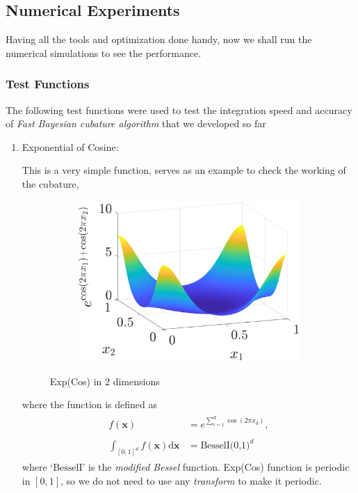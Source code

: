 \documentclass[smallextended]{svjour3}       %
\newcommand{\bm}[1]{\boldsymbol{#1}}
\newcommand{\dif}[1]{\text{d}{#1}}
\newcommand{\vx}{\bm{x}}
\newcommand{\dvx}{\dif{\bm{x}}}
\begin{document}
\subsection{Numerical Experiments}
\label{sec:numerical_experiments}

Having all the tools and optimization done handy, now we shall run the numerical simulations to see the performance.

\subsubsection{Test Functions}

The following test functions were used to test the integration speed and accuracy of \textit{Fast Bayesian cubature algorithm} that we developed so far

\begin{enumerate}
\item Exponential of Cosine: 

This is a very simple function, serves as an example to check the working of the cubature,
\begin{figure}[H]
\linespread{0.7}
\centering
\captionsetup[subfigure]{labelformat=empty}
\begin{subfigure}[b]{0.48\textwidth}
\includegraphics[width=\textwidth]{ExpCos}
\end{subfigure}
\caption{Exp(Cos) in 2 dimensions}
\label{fig:Exp(Cos)}
\end{figure}
where the function is defined as
\begin{align*}
\begin{matrix}
f(\vx) &= e^{\sum_{i=1}^d\cos(2 \pi x_d)},  
\\
\\
\int_{[0,1]^d} f(\vx) \dvx &= \text{BesselI(0,1)}^d
\end{matrix}
\end{align*}
where `$\text{BesselI}$' is the \textit{modified Bessel} function. Exp(Cos) function is periodic in $[0,1]$, so we do not need to use any \textit{transform} to make it periodic.








\end{enumerate}
\end{document}
